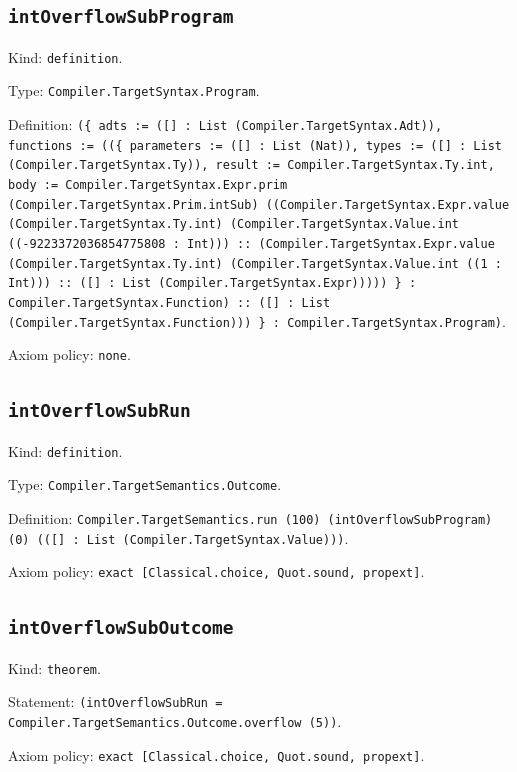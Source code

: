 \documentclass[11pt]{article}
\begin{document}
\subsection*{\texttt{intOverflowSubProgram}}
\noindent Kind: \texttt{definition}.\par
\noindent Type: \texttt{Compiler.TargetSyntax.Program}.\par
\noindent Definition: \texttt{(\{ adts := ([] : List (Compiler.TargetSyntax.Adt)), functions := ((\{ parameters := ([] : List (Nat)), types := ([] : List (Compiler.TargetSyntax.Ty)), result := Compiler.TargetSyntax.Ty.int, body := Compiler.TargetSyntax.Expr.prim (Compiler.TargetSyntax.Prim.intSub) ((Compiler.TargetSyntax.Expr.value (Compiler.TargetSyntax.Ty.int) (Compiler.TargetSyntax.Value.int ((-9223372036854775808 : Int))) :: (Compiler.TargetSyntax.Expr.value (Compiler.TargetSyntax.Ty.int) (Compiler.TargetSyntax.Value.int ((1 : Int))) :: ([] : List (Compiler.TargetSyntax.Expr))))) \} : Compiler.TargetSyntax.Function) :: ([] : List (Compiler.TargetSyntax.Function))) \} : Compiler.TargetSyntax.Program)}.\par
\noindent Axiom policy: \texttt{none}.\par
\subsection*{\texttt{intOverflowSubRun}}
\noindent Kind: \texttt{definition}.\par
\noindent Type: \texttt{Compiler.TargetSemantics.Outcome}.\par
\noindent Definition: \texttt{Compiler.TargetSemantics.run (100) (intOverflowSubProgram) (0) (([] : List (Compiler.TargetSyntax.Value)))}.\par
\noindent Axiom policy: \texttt{exact [Classical.choice, Quot.sound, propext]}.\par
\subsection*{\texttt{intOverflowSubOutcome}}
\noindent Kind: \texttt{theorem}.\par
\noindent Statement: \texttt{(intOverflowSubRun = Compiler.TargetSemantics.Outcome.overflow (5))}.\par
\noindent Axiom policy: \texttt{exact [Classical.choice, Quot.sound, propext]}.\par
\end{document}
